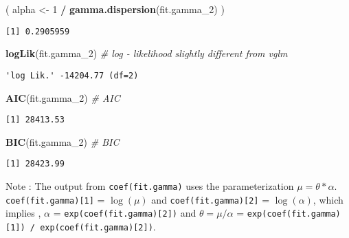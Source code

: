 \documentclass[]{book}
\newenvironment{Shaded}{\begin{snugshade}}{\end{snugshade}}
\newcommand{\KeywordTok}[1]{\textcolor[rgb]{0.13,0.29,0.53}{\textbf{#1}}}
\newcommand{\DecValTok}[1]{\textcolor[rgb]{0.00,0.00,0.81}{#1}}
\newcommand{\StringTok}[1]{\textcolor[rgb]{0.31,0.60,0.02}{#1}}
\newcommand{\CommentTok}[1]{\textcolor[rgb]{0.56,0.35,0.01}{\textit{#1}}}
\newcommand{\OperatorTok}[1]{\textcolor[rgb]{0.81,0.36,0.00}{\textbf{#1}}}
\newcommand{\NormalTok}[1]{#1}
\theoremstyle{definition}
\theoremstyle{definition}
\theoremstyle{definition}
\theoremstyle{remark}
\begin{document}
\begin{Shaded}
\begin{Highlighting}[]
\NormalTok{( alpha <-}\StringTok{ }\DecValTok{1} \OperatorTok{/}\StringTok{ }\KeywordTok{gamma.dispersion}\NormalTok{(fit.gamma_}\DecValTok{2}\NormalTok{) )}
\end{Highlighting}
\end{Shaded}

\begin{verbatim}
[1] 0.2905959
\end{verbatim}

\begin{Shaded}
\begin{Highlighting}[]
\KeywordTok{logLik}\NormalTok{(fit.gamma_}\DecValTok{2}\NormalTok{)  }\CommentTok{# log - likelihood slightly different from vglm}
\end{Highlighting}
\end{Shaded}

\begin{verbatim}
'log Lik.' -14204.77 (df=2)
\end{verbatim}

\begin{Shaded}
\begin{Highlighting}[]
\KeywordTok{AIC}\NormalTok{(fit.gamma_}\DecValTok{2}\NormalTok{)     }\CommentTok{# AIC}
\end{Highlighting}
\end{Shaded}

\begin{verbatim}
[1] 28413.53
\end{verbatim}

\begin{Shaded}
\begin{Highlighting}[]
\KeywordTok{BIC}\NormalTok{(fit.gamma_}\DecValTok{2}\NormalTok{)     }\CommentTok{# BIC}
\end{Highlighting}
\end{Shaded}

\begin{verbatim}
[1] 28423.99
\end{verbatim}

Note : The output from \texttt{coef(fit.gamma)} uses the
parameterization \(\mu = \theta * \alpha\).
\texttt{coef(fit.gamma){[}1{]}} = \(\log(\mu)\) and
\texttt{coef(fit.gamma){[}2{]}} = \(\log(\alpha)\), which implies ,
\(\alpha\) = \texttt{exp(coef(fit.gamma){[}2{]})} and
\(\theta = \mu / \alpha\) =
\texttt{exp(coef(fit.gamma){[}1{]})\ /\ exp(coef(fit.gamma){[}2{]})}.
\end{document}
